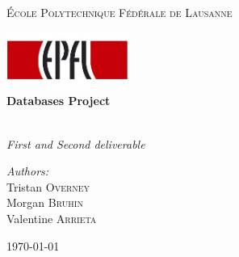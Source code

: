 \begin{titlepage}
\begin{center}


\textsc{\LARGE \'Ecole Polytechnique Fédérale de Lausanne}

\includegraphics[width=0.3\textwidth]{EPFL_logo.jpg}~\\[5cm]

{ \huge \bfseries Databases Project \\[0.4cm] }

\HRule \\[0.4cm]

{ \huge \emph{First and Second deliverable} \\[6cm] }

\noindent
\begin{minipage}{0.4\textwidth}
\begin{center} \large
\emph{Authors:}\\
Tristan \textsc{Overney}\\
Morgan \textsc{Bruhin}\\
Valentine \textsc{Arrieta}
\end{center}
\end{minipage}%


\vfill

{\large \today}

\end{center}
\end{titlepage}